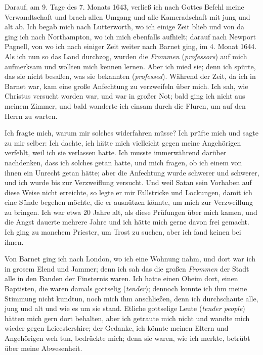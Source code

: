 Darauf, am 9. Tage des 7. Monats 1643, 
verließ ich nach
Gottes Befehl meine Verwandtschaft und brach allen Umgang und
alle Kameradschaft mit jung und alt ab. Ich begab mich nach
Lutterworth, wo ich einige Zeit blieb 
und von da ging ich nach
Northampton, wo ich mich ebenfalls 
aufhielt; darauf nach Newport
Pagnell, von wo ich nach einiger Zeit weiter nach Barnet
ging, im 4. Monat 1644. Als ich nun so das Land durchzog,
wurden die \textit{Frommen} (\textit{professors}) 
auf mich aufmerksam und
wollten mich kennen lernen. Aber ich mied sie; denn ich spürte,
das sie nicht besaßen, was sie bekannten (\textit{professed}). Während
der Zeit, da ich in Barnet war, kam eine 
große Anfechtung zu
verzweifeln über mich. Ich sah, wie Christus versucht worden
war, und war in großer Not; bald ging ich nicht aus meinem
Zimmer, und bald wanderte ich einsam durch die Fluren, um auf
den Herrn zu warten.

Ich fragte mich, warum mir solches widerfahren müsse? Ich
prüfte mich und sagte zu mir selber:  
Ich dachte, ich hätte mich vielleicht gegen meine Angehörigen 
verfehlt, weil ich sie verlassen hatte. Ich musste immerwährend 
darüber nachdenken, dass ich solches getan hatte, und
mich fragen, ob ich einem von ihnen ein Unrecht getan hätte;
aber die Anfechtung wurde schwerer und schwerer, und ich wurde
bis zur Verzweiflung versucht. Und weil Satan sein Vorhaben
auf diese Weise nicht erreichte, so legte er mir Fallstricke und
Lockungen, damit ich eine Sünde begehen möchte, die er ausnützen 
könnte, um mich zur Verzweiflung zu bringen. Ich war
etwa 20 Jahre alt, als diese Prüfungen über mich kamen, und
die Angst dauerte mehrere Jahre und ich hätte mich gerne davon
frei gemacht. Ich ging zu manchem Priester, um Trost zu suchen,
aber ich fand keinen bei ihnen.

Von Barnet ging ich nach London, wo ich eine 
Wohnung nahm,
und dort war ich in grosem Elend und Jammer; denn ich sah
das die großen \textit{Frommen} der Stadt alle in den Banden der
Finsternis waren. Ich hatte einen Oheim dort, 
einen Baptisten,
die waren damals gottselig (\textit{tender}); dennoch 
konnte ich ihm meine
Stimmung nicht kundtun, noch mich ihm anschließen, denn ich
durchschaute alle, jung und alt und wie es um sie stand. Etliche
gottselige Leute (\textit{tender people}) hätten 
mich gern dort behalten,
aber ich getraute mich nicht und wandte mich wieder gegen
Leicestershire; der Gedanke, ich könnte meinen Eltern und Angehörigen 
weh tun, bedrückte mich; denn sie waren, wie ich merkte,
betrübt über meine Abwesenheit.


